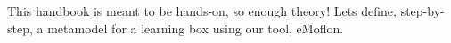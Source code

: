 This handbook is meant to be hands-on, so enough theory! Lets define, step-by-step, a metamodel for a learning box using our tool, eMoflon.

